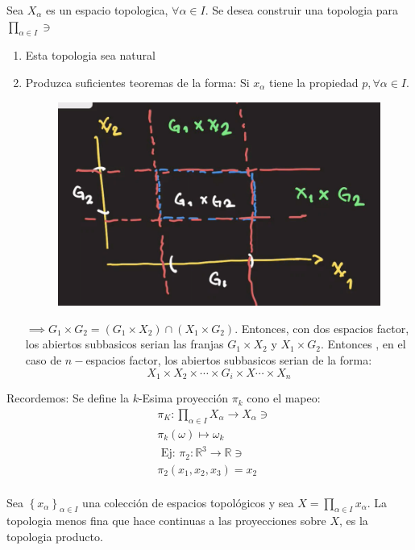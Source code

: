 \begin{problema}
    Sea $X_\alpha$ es un espacio topologica, $\forall \alpha\in I$. Se desea construir una topologia para $\prod_{\alpha\in I}\ni $
    \begin{enumerate}
        \item Esta topologia sea natural 
        \item Produzca suficientes teoremas de la forma: Si $x_\alpha$ tiene la propiedad $p,\forall \alpha \in I$. 
    \begin{figure}[H]
        \centering
        \includegraphics[scale=1]{imagenes/ejemplo2.png}
    \end{figure}
    $\implies G_1\times G_2=(G_1\times X_2)\cap (X_1\times G_2)$. Entonces, con dos espacios factor, los abiertos subbasicos serian las franjas $G_1\times X_2$ y $X_1\times G_2$. Entonces , en el caso de $n-$espacios factor, los abiertos subbasicos serian de la forma: 
    $$X_1\times X_2\times\cdots \times G_i\times X\cdots \times X_n$$
    \end{enumerate}
\end{problema}
\begin{cajita}
    Recordemos: Se define la $k$-Esima proyección $\pi_k$ cono el mapeo:
$$
\begin{aligned}
& \pi_K: \prod_{\alpha \in I} X_{\alpha} \longrightarrow X_{\alpha} \ni \\
& \pi_k(\omega) \longmapsto \omega_k \\
& \text { Ej: } \pi_2: \mathbb{R}^3 \longrightarrow \mathbb{R} \ni \\
& \pi_2\left(x_1, x_2, x_3\right)=x_2 \\
&
\end{aligned}
$$
\end{cajita}
\begin{definicion}
    Sea $\left\{x_\alpha \right\}_{\alpha \in I}$ una colección de espacios topológicos y sea $X=\prod_{\alpha \in I} x_\alpha$. La topologia menos fina que hace continuas a las proyecciones sobre $X$, es la topologia producto.
\end{definicion}

